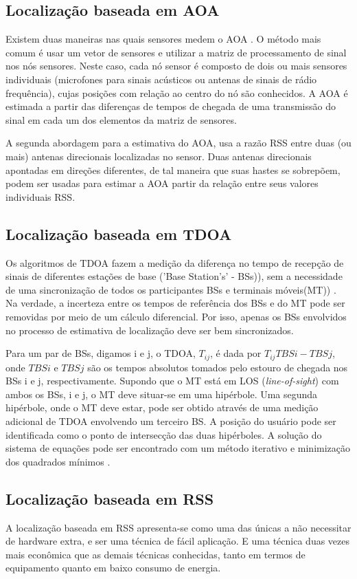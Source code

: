 \documentclass[12pt]{article}
\begin{document}
\subsection{Localização baseada em AOA}
      Existem duas maneiras nas quais sensores medem o AOA \cite{aoa}. O método mais
comum é usar um vetor de sensores e utilizar a matriz de processamento de sinal nos nós sensores. Neste caso, cada nó sensor é
composto de dois ou mais sensores individuais (microfones para sinais acústicos ou antenas de sinais de rádio frequência),
cujas posições com relação ao centro do nó são conhecidos. A AOA é estimada a partir
das diferenças de tempos de chegada de uma transmissão do sinal em cada um dos elementos da matriz de sensores.

  A segunda abordagem para a estimativa do AOA, usa a razão RSS entre duas (ou
mais) antenas direcionais localizadas no sensor. Duas antenas direcionais apontadas em
direções diferentes, de tal maneira que suas hastes se sobrepõem, podem ser usadas para
estimar a AOA partir da relação entre seus valores individuais RSS.

\subsection{Localização baseada em TDOA}
  Os algoritmos de TDOA fazem a medição da diferença no tempo de recepção
de sinais de diferentes estações de base ('Base Station's' - BSs)), sem a necessidade de uma sincronização de
todos os participantes BSs e terminais móveis(MT)) \cite{tdoa}. Na verdade, a incerteza entre os tempos de referência
dos BSs e do MT pode ser removidas por meio de um cálculo diferencial. Por isso, apenas
os BSs envolvidos no processo de estimativa de localização deve ser bem sincronizados.

Para um par de BSs, digamos i e j, o TDOA,
$T_{ij}$, é dada por $T_{ij} TBSi - TBSj$, onde $TBSi$ e $TBSj$ são os tempos absolutos tomados 
pelo estouro de chegada nos BSs i e j, respectivamente. Supondo que o MT está em LOS (\textit{line-of-sight}) com ambos os BSs, i
e j, o MT deve situar-se em uma hipérbole. Uma segunda hipérbole, onde o
MT deve estar, pode ser obtido através de uma medição adicional de TDOA envolvendo
um terceiro BS. A posição do usuário pode ser identificada como o ponto de intersecção
das duas hipérboles. A solução do sistema de equações pode ser encontrado com um
método iterativo e minimização dos quadrados mínimos \cite{tdoa}.

\subsection{Localização baseada em RSS}	
	A localização baseada em RSS apresenta-se como uma das únicas a não necessitar de hardware extra, e ser uma técnica
de fácil aplicação. E uma técnica duas vezes mais econômica que as demais técnicas conhecidas, 
tanto em termos de equipamento quanto em baixo consumo de energia\cite{rss1}.
\end{document}
